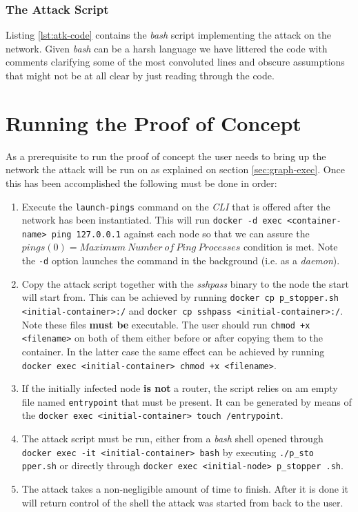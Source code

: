         \subsubsection{The Attack Script}
            Listing \ref{lst:atk-code} contains the \textit{bash} script implementing the attack on the network. Given \textit{bash} can be a harsh language we have littered the code with comments clarifying some of the most convoluted lines and obscure assumptions that might not be at all clear by just reading through the code.

            

    \section{Running the Proof of Concept}
        As a prerequisite to run the proof of concept the user needs to bring up the network the attack will be run on as explained on section \ref{sec:graph-exec}. Once this has been accomplished the following must be done in order:

        \begin{enumerate}
            \item Execute the \texttt{launch-pings} command on the \textit{CLI} that is offered after the network has been instantiated. This will run \texttt{docker -d exec <container-name> ping 127.0.0.1} against each node so that we can assure the $pings(0) = Maximum\ Number\ of\ Ping\ Processes$ condition is met. Note the \texttt{-d} option launches the command in the background (i.e. as a \textit{daemon}).
            \item Copy the attack script together with the \textit{sshpass} binary to the node the start will start from. This can be achieved by running \texttt{docker cp p\_stopper.sh <initial-container>:/} and \texttt{docker cp sshpass <initial-container>:/}. Note these files \textbf{must be} executable. The user should run \texttt{chmod +x <filename>} on both of them either before or after copying them to the container. In the latter case the same effect can be achieved by running \texttt{docker exec <initial-container> chmod +x <filename>}.
            \item If the initially infected node \textbf{is not} a router, the script relies on am empty file named \texttt{entrypoint} that must be present. It can be generated by means of the \texttt{docker exec <initial-container> touch /entrypoint}.
            \item The attack script must be run, either from a \textit{bash} shell opened through \texttt{docker exec -it <initial-container> bash} by executing \texttt{./p\_sto pper.sh} or directly through \texttt{docker exec <initial-node> p\_stopper .sh}.
            \item The attack takes a non-negligible amount of time to finish. After it is done it will return control of the shell the attack was started from back to the user.
        \end{enumerate}

